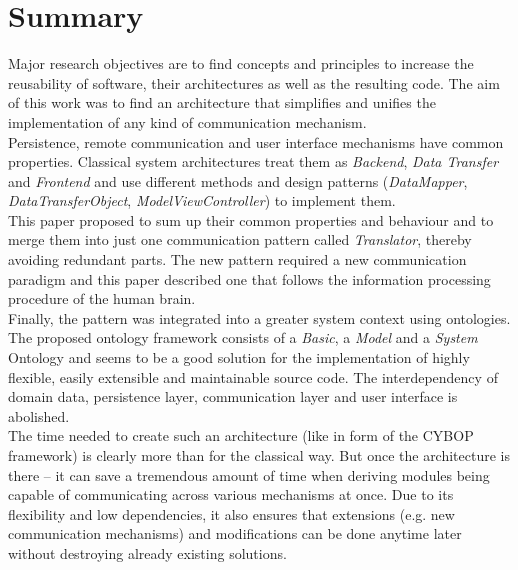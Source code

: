 %
%
%
%
%
%
%

\section{Summary}
\label{summary_heading}

Major research objectives are to find concepts and principles to increase the
reusability of software, their architectures as well as the resulting code.
The aim of this work was to find an architecture that simplifies and unifies the
implementation of any kind of communication mechanism.\\
Persistence, remote communication and user interface mechanisms have common properties.
Classical system architectures treat them as \emph{Backend}, \emph{Data Transfer}
and \emph{Frontend} and use different methods and design patterns (\emph{DataMapper},
\emph{DataTransferObject}, \emph{ModelViewController}) to implement them.\\
This paper proposed to sum up their common properties and behaviour and to merge
them into just one communication pattern called \emph{Translator}, thereby avoiding
redundant parts. The new pattern required a new communication paradigm and this paper
described one that follows the information processing procedure of the human brain.\\
Finally, the pattern was integrated into a greater system context using ontologies.
The proposed ontology framework consists of a \emph{Basic}, a \emph{Model} and a
\emph{System} Ontology and seems to be a good solution for the implementation of
highly flexible, easily extensible and maintainable source code. The interdependency
of domain data, persistence layer, communication layer and user interface is
abolished.\\
The time needed to create such an architecture (like in form of the CYBOP framework)
is clearly more than for the classical way. But once the architecture is there --
it can save a tremendous amount of time when deriving modules being capable of
communicating across various mechanisms at once. Due to its flexibility and low
dependencies, it also ensures that extensions (e.g. new communication mechanisms)
and modifications can be done anytime later without destroying already existing
solutions.

